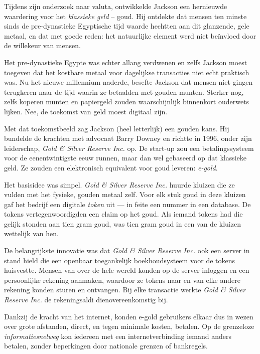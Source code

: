 \documentclass[
  a5paper,
  smalldemyvopaper,11pt,twoside,onecolumn,openright,extrafontsizes,
hidelinks]{memoir}
\begin{document}
Tijdens zijn onderzoek naar valuta, ontwikkelde Jackson een hernieuwde
waardering voor het \emph{klassieke geld} -- goud. Hij ontdekte dat
mensen ten minste sinds de pre-dynastieke Egyptische tijd waarde
hechtten aan dit glanzende, gele metaal, en dat met goede reden: het
natuurlijke element werd niet beïnvloed door de willekeur van mensen.

Het pre-dynastieke Egypte was echter allang verdwenen en zelfs Jackson
moest toegeven dat het kostbare metaal voor dagelijkse transacties niet
echt praktisch was. Nu het nieuwe millennium naderde, besefte Jackson
dat mensen niet gingen terugkeren naar de tijd waarin ze betaalden met
gouden munten. Sterker nog, zelfs koperen munten en papiergeld zouden
waarschijnlijk binnenkort ouderwets lijken. Nee, de toekomst van geld
moest digitaal zijn.

Met dat toekomstbeeld zag Jackson (heel letterlijk) een gouden kans. Hij
bundelde de krachten met advocaat Barry Downey en richtte in 1996, onder
zijn leiderschap, \emph{Gold \& Silver Reserve Inc.} op. De start-up zou
een betalingssysteem voor de eenentwintigste eeuw runnen, maar dan wel
gebaseerd op dat klassieke geld. Ze zouden een elektronisch equivalent
voor goud leveren: \emph{e-gold}.

Het basisidee was simpel. \emph{Gold \& Silver Reserve Inc.} huurde
kluizen die ze vulden met het fysieke, gouden metaal zelf. Voor elk stuk
goud in deze kluizen gaf het bedrijf een digitale \emph{token} uit ---
in feite een nummer in een database. De tokens vertegenwoordigden een
claim op het goud. Als iemand tokens had die gelijk stonden aan tien
gram goud, was tien gram goud in een van de kluizen wettelijk van hen.

De belangrijkste innovatie was dat \emph{Gold \& Silver Reserve Inc.}
ook een server in stand hield die een openbaar toegankelijk
boekhoudsysteem voor de tokens huisvestte. Mensen van over de hele
wereld konden op de server inloggen en een persoonlijke rekening
aanmaken, waardoor ze tokens naar en van elke andere rekening konden
sturen en ontvangen. Bij elke transactie werkte \emph{Gold \& Silver
Reserve Inc.} de rekeningsaldi dienovereenkomstig bij.

Dankzij de kracht van het internet, konden e-gold gebruikers elkaar dus
in wezen over grote afstanden, direct, en tegen minimale kosten,
betalen. Op de grenzeloze \emph{informatiesnelweg} kon iedereen met een
internetverbinding iemand anders betalen, zonder beperkingen door
nationale grenzen of bankregels.
\end{document}
